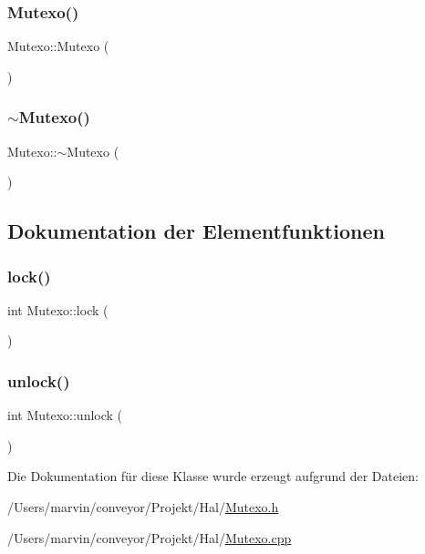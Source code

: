 \subsubsection{\texorpdfstring{Mutexo()}{Mutexo()}}
{\footnotesize\ttfamily Mutexo\+::\+Mutexo (\begin{DoxyParamCaption}{ }\end{DoxyParamCaption})}

\hypertarget{class_mutexo_af8942ad328e7c91931f63e6a243081d1}{}\label{class_mutexo_af8942ad328e7c91931f63e6a243081d1} 
\subsubsection{\texorpdfstring{$\sim$\+Mutexo()}{~Mutexo()}}
{\footnotesize\ttfamily Mutexo\+::$\sim$\+Mutexo (\begin{DoxyParamCaption}{ }\end{DoxyParamCaption})\hspace{0.3cm}{\ttfamily [virtual]}}



\subsection{Dokumentation der Elementfunktionen}
\hypertarget{class_mutexo_a22aac64070af68adc9acc1fef3d3f4aa}{}\label{class_mutexo_a22aac64070af68adc9acc1fef3d3f4aa} 
\subsubsection{\texorpdfstring{lock()}{lock()}}
{\footnotesize\ttfamily int Mutexo\+::lock (\begin{DoxyParamCaption}{ }\end{DoxyParamCaption})}

\hypertarget{class_mutexo_a9f51083616ed99edc2add313f840016c}{}\label{class_mutexo_a9f51083616ed99edc2add313f840016c} 
\subsubsection{\texorpdfstring{unlock()}{unlock()}}
{\footnotesize\ttfamily int Mutexo\+::unlock (\begin{DoxyParamCaption}{ }\end{DoxyParamCaption})}



Die Dokumentation für diese Klasse wurde erzeugt aufgrund der Dateien\+:\begin{DoxyCompactItemize}
\item 
/\+Users/marvin/conveyor/\+Projekt/\+Hal/\hyperlink{_mutexo_8h}{Mutexo.\+h}\item 
/\+Users/marvin/conveyor/\+Projekt/\+Hal/\hyperlink{_mutexo_8cpp}{Mutexo.\+cpp}\end{DoxyCompactItemize}
